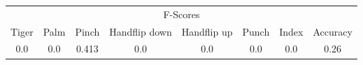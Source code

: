 \documentclass{standalone}
\begin{document}
 
 \begin{tabular}{|c|c|c|c|c|c|c ||c|}
\cline{1-8}\multicolumn{8}{|c|}{F-Scores} \\ 
\cline{1-8}Tiger & Palm & Pinch & Handflip down & Handflip up & Punch & Index & Accuracy\\ 
\cline{1-8}0.0 & 0.0 & 0.413 & 0.0 & 0.0 & 0.0 & 0.0 & 0.26\\ 
 \cline{1-8}\hline \end{tabular}
 
\end{document}
